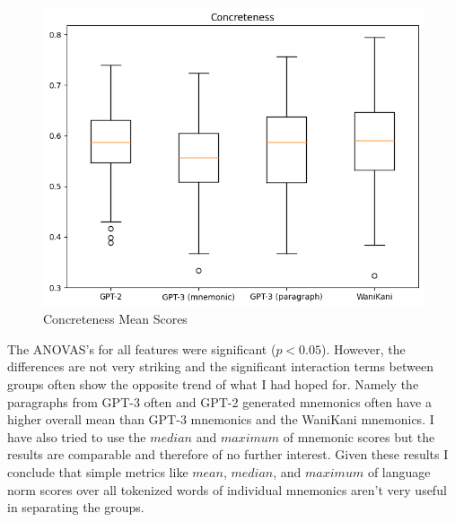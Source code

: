 \begin{figure}
    \centering
    \includegraphics[width=400pt]{resources/concr_mean_box_plot.png}
    \caption{Concreteness Mean Scores}
    \label{figure:concr_mean_box_plot}
\end{figure}
The ANOVAS's for all features were significant ($p < 0.05$). However, the differences are not very striking and the significant interaction terms between groups often show the opposite trend of what I had hoped for. Namely the paragraphs from GPT-3 often and GPT-2 generated mnemonics often have a higher overall mean than GPT-3 mnemonics and the WaniKani mnemonics. I have also tried to use the $median$ and $maximum$ of mnemonic scores but the results are comparable and therefore of no further interest. Given these results I conclude that simple metrics like $mean$, $median$, and $maximum$ of language norm scores over all tokenized words of individual mnemonics aren't very useful in separating the groups.

